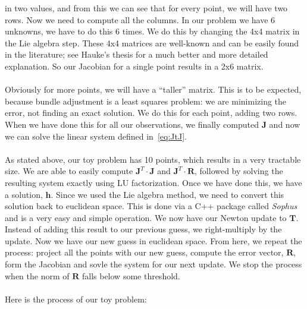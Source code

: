 \documentclass{article}
\begin{document}
in two values, and from this we can see that for every point, we will
have two rows.  Now we need to compute all the columns.  In our
problem we have 6 unknowns, we have to do this 6 times.  We do this by
changing the 4x4 matrix in the Lie algebra step.  These 4x4 matrices
are well-known and can be easily found in the literature; see Hauke's
thesis \cite{strasdat2012local} for a much better and more detailed
explanation.  So our Jacobian for a single point results in a 2x6
matrix.
\\
\\
Obviously for more points, we will have a ``taller'' matrix.  This is
to be expected, because bundle adjustment is a least squares problem:
we are minimizing the error, not finding an exact solution.  We do
this for each point, adding two rows.  When we have done this for all
our observations, we finally computed $\mathbf{J}$ and now we can
solve the linear system defined in~\ref{eq:JtJ}.
\\
\\
As stated above, our toy problem has 10 points, which results in a
very tractable size.  We are able to easily compute
$\mathbf{J}^T\cdot\mathbf{J}$ and $\mathbf{J}^T\cdot\mathbf{R}$,
followed by solving the resulting system exactly using LU
factorization.  Once we have done this, we have a solution,
$\mathbf{h}$.  Since we used the Lie algebra method, we need to
convert this solution back to euclidean space.  This is done via a C++
package called \emph{Sophus} and is a very easy and simple operation.
We now have our Newton update to $\mathbf{T}$.  Instead of adding this
result to our previous guess, we right-multiply by the update.  Now we
have our new guess in euclidean space.  From here, we repeat the
process: project all the points with our new guess, compute the error
vector, $\mathbf{R}$, form the Jacobian and sovle the system for our
next update.  We stop the process when the norm of $\mathbf{R}$ falls
below some threshold.
\\
\\
Here is the process of our toy problem:
\end{document}
